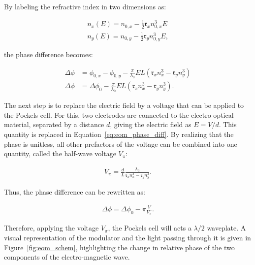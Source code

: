 By labeling the refractive index in two dimensions as:

\begin{align}
	n_x(E) = n_{0,x} - \frac{1}{2} \mathfrak{r}_x n_{0,x}^3 E \\
	n_y(E) = n_{0,y} - \frac{1}{2} \mathfrak{r}_y n_{0,y}^3 E,
\end{align}

the phase difference becomes:

\begin{align}
	\Delta \phi & = \phi_{0,x} - \phi_{0,y} - \frac{\pi}{\lambda_0} E L \left(\mathfrak{r}_x n_x^3 - \mathfrak{r}_y n_y^3\right) \\
	\Delta \phi & = \Delta \phi_{0} - \frac{\pi}{\lambda_0} E L \left(\mathfrak{r}_x n_x^3 - \mathfrak{r}_y n_y^3\right).
	\label{eq:eom_phase_diff}
\end{align}

\begin{figure}[tbp]%
\end{figure}

The next step is to replace the electric field by a voltage that can be applied to the Pockels cell. For this, two electrodes are connected to the electro-optical material, separated by a distance $d$, giving the electric field as $E=V/d$. This quantity is replaced in Equation~\ref{eq:eom_phase_diff}. By realizing that the phase is unitless, all other prefactors of the voltage can be combined into one quantity, called the half-wave voltage $V_\pi$:

\begin{align}
	V_\pi = \frac{d}{L} \frac{\lambda_0}{\mathfrak{r}_x n_x^3 - \mathfrak{r}_y n_y^3}.
\end{align}

Thus, the phase difference can be rewritten as:

\begin{align}
	\Delta \phi = \Delta \phi_0 - \pi \frac{V}{V_\pi}.
\end{align}

Therefore, applying the voltage $V_\pi$, the Pockels cell will acts a $\lambda/2$ waveplate. A visual representation of the modulator and the light passing through it is given in Figure~\ref{fig:eom_schem}, highlighting the change in relative phase of the two components of the electro-magnetic wave.


